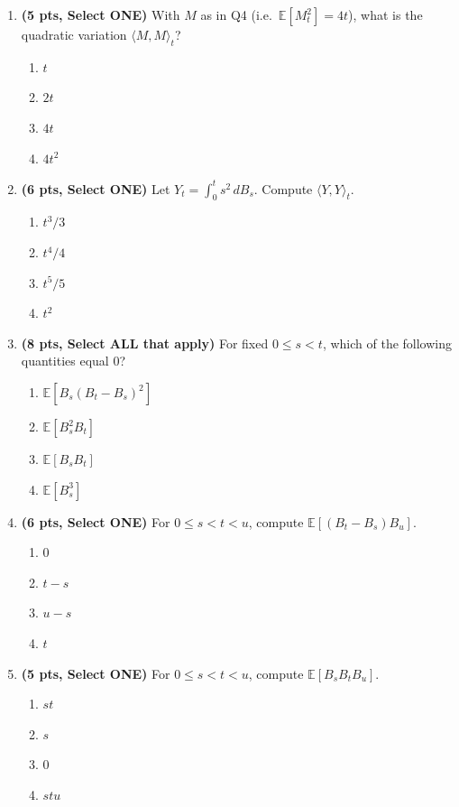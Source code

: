 \documentclass[11pt]{article}
\newcommand{\E}{\mathbb{E}}
\begin{document}
\begin{enumerate}
\item[\textbf{Q5.}] \textbf{(5 pts, Select ONE)} With $M$ as in Q4 (i.e.\ $\E[M_t^2]=4t$), what is the quadratic variation $\langle M,M\rangle_t$?
\begin{enumerate}
  \item $t$
  \item $2t$
  \item $4t$
  \item $4t^2$
\end{enumerate}

\item[\textbf{Q6.}] \textbf{(6 pts, Select ONE)} Let $Y_t=\int_0^t s^2\,dB_s$. Compute $\langle Y,Y\rangle_t$.
\begin{enumerate}
  \item $t^3/3$
  \item $t^4/4$
  \item $t^5/5$
  \item $t^2$
\end{enumerate}

\item[\textbf{Q7.}] \textbf{(8 pts, Select ALL that apply)} For fixed $0\le s<t$, which of the following quantities equal $0$?
\begin{enumerate}
  \item $\E[B_s(B_t-B_s)^2]$
  \item $\E[B_s^2B_t]$
  \item $\E[B_sB_t]$
  \item $\E[B_s^3]$
\end{enumerate}

\item[\textbf{Q8.}] \textbf{(6 pts, Select ONE)} For $0\le s<t<u$, compute $\E[(B_t-B_s)B_u]$.
\begin{enumerate}
  \item $0$
  \item $t-s$
  \item $u-s$
  \item $t$
\end{enumerate}

\item[\textbf{Q9.}] \textbf{(5 pts, Select ONE)} For $0\le s<t<u$, compute $\E[B_sB_tB_u]$.
\begin{enumerate}
  \item $st$
  \item $s$
  \item $0$
  \item $stu$
\end{enumerate}


\end{enumerate}
\end{document}
